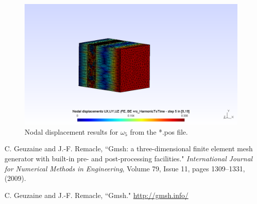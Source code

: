 \documentclass[a4]{article}
\begin{document}
\begin{figure}[h!]
	\centering
	\includegraphics[scale = 0.5]{u_w5.png}
	\caption{Nodal displacement results for $\omega_5$ from the *.pos file.}
	\label{fig:u_w5}
\end{figure}

\FloatBarrier

\begin{thebibliography}{99}
	
	 C. Geuzaine and J.-F. Remacle, ``Gmsh: a three-dimensional finite element mesh generator with built-in pre- and post-processing facilities." \textit{International Journal for Numerical Methods in Engineering}, Volume 79, Issue 11, pages 1309--1331, (2009).
	
	  C. Geuzaine and J.-F. Remacle, ``Gmsh." \url{http://gmsh.info/}
	
\end{thebibliography}
\end{document}
